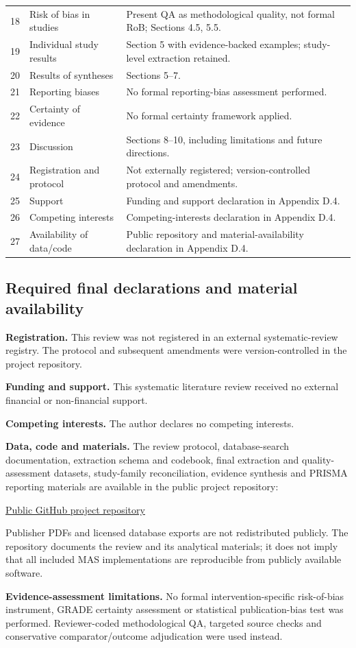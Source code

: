 \begin{longtable}{@{}p{}p{}p{}@{}}
18 & Risk of bias in studies & Present QA as methodological quality, not formal RoB; Sections 4.5, 5.5.\\
19 & Individual study results & Section 5 with evidence-backed examples; study-level extraction retained.\\
20 & Results of syntheses & Sections 5--7.\\
21 & Reporting biases & No formal reporting-bias assessment performed.\\
22 & Certainty of evidence & No formal certainty framework applied.\\
23 & Discussion & Sections 8--10, including limitations and future directions.\\
24 & Registration and protocol & Not externally registered; version-controlled protocol and amendments.\\
25 & Support & Funding and support declaration in Appendix D.4.\\
26 & Competing interests & Competing-interests declaration in Appendix D.4.\\
27 & Availability of data/code & Public repository and material-availability declaration in Appendix D.4.\\
\bottomrule\end{longtable}\endgroup
\subsection{Required final declarations and material availability}
\noindent\textbf{Registration.} This review was not registered in an external systematic-review registry. The protocol and subsequent amendments were version-controlled in the project repository.
\par\noindent\textbf{Funding and support.}
This systematic literature review received no external
financial or non-financial support.
\par\noindent\textbf{Competing interests.}
The author declares no competing interests.
\par\noindent\textbf{Data, code and materials.}
The review protocol, database-search documentation,
extraction schema and codebook, final extraction and
quality-assessment datasets, study-family reconciliation,
evidence synthesis and PRISMA reporting materials are
available in the public project repository:

\href{https://github.com/ChayanTalukder/Multi-Agent-Systems-for-Sustainable-Smart-Farming/tree/main}{Public GitHub project repository}

Publisher PDFs and licensed database exports are not
redistributed publicly. The repository documents the
review and its analytical materials; it does not imply
that all included MAS implementations are reproducible
from publicly available software.
\par\noindent\textbf{Evidence-assessment limitations.} No formal intervention-specific risk-of-bias instrument, GRADE certainty assessment or statistical publication-bias test was performed. Reviewer-coded methodological QA, targeted source checks and conservative comparator/outcome adjudication were used instead.
